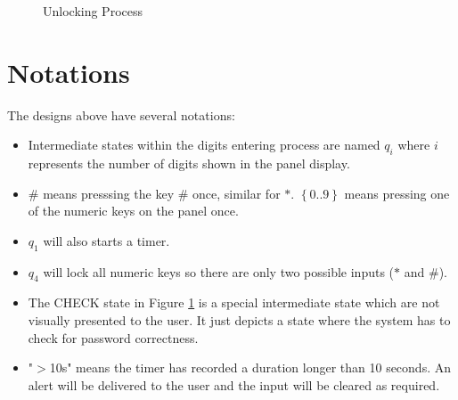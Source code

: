 \documentclass[12pt]{article}
\begin{document}
\begin{figure}[H]
  \centering
  \caption{Unlocking Process}
  \label{fig:unlocking}
\end{figure}

\section{Notations}

The designs above have several notations:
\begin{itemize}
  \item Intermediate states within the digits entering process are named $q_i$ where $i$ represents the number of digits shown in the panel display.
  \item $\#$ means presssing the key $\#$ once, similar for $*$. $\left\{0..9\right\}$ means pressing one of the numeric keys on the panel once.
  \item $q_1$ will also starts a timer.
  \item $q_4$ will lock all numeric keys so there are only two possible inputs ($*$ and $\#$).
  \item The CHECK state in Figure \ref{fig:unlocking} is a special intermediate state which are not visually presented to the user. It just depicts a state where the system has to check for password correctness.
  \item "$>$10s" means the timer has recorded a duration longer than 10 seconds. An alert will be delivered to the user and the input will be cleared as required.
\end{itemize}
\end{document}
